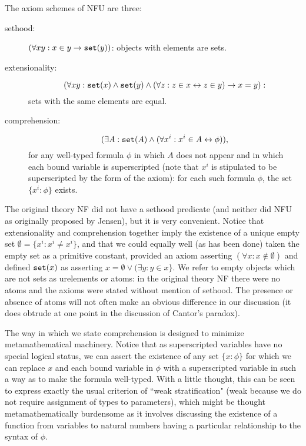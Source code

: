 \documentclass{slides}
\begin{document}
\begin{slide}

The axiom schemes of NFU are three:

\begin{description}

\item[sethood:]  $(\forall xy:  x \in y \rightarrow {\tt set}(y))$:  objects with elements are sets.

\item[extensionality:]  $$(\forall xy:  {\tt set}(x) \wedge {\tt set}(y) \wedge (\forall z:z \in x \leftrightarrow z \in y) \rightarrow x=y):$$  sets with the same elements are equal.

\item[comprehension:]  $$(\exists A:{\tt set}(A) \wedge (\forall x^i:x^i \in A \leftrightarrow \phi)),$$ for any well-typed formula $\phi$ in which $A$ does not appear and in which each bound variable is superscripted (note that $x^i$ is stipulated to be superscripted by the form of the axiom):  for each such formula $\phi$, the set $\{x^i:\phi\}$ exists.

\end{description}

\end{slide}

\begin{slide}

The original theory NF did not have a sethood predicate (and neither did NFU as originally proposed by Jensen), but it is very convenient.  Notice that extensionality and comprehension together imply the existence of a unique empty set $\emptyset = \{x^i:x^i \neq x^i\}$, and that we could equally well (as has been done) taken the empty set as a primitive constant,
provided an axiom asserting $(\forall x:x \not\in \emptyset)$
and defined ${\tt set}(x)$ as asserting $x = \emptyset \vee (\exists y:y \in x\}$.  We refer to empty objects which are not sets as urelements or atoms:  in the original theory NF there were no atoms and the axioms were stated without mention of sethood.  The presence or absence of atoms will not often make an obvious difference in our discussion (it does obtrude at one point in the discussion of Cantor's paradox).

\end{slide}

\begin{slide}

The way in which we state comprehension is designed to minimize metamathematical machinery.  Notice that as superscripted variables have no special logical status,
we can assert the existence of any set $\{x:\phi\}$ for which we can replace $x$ and each bound variable in $\phi$ with a superscripted variable in such a way as to make the
formula well-typed.  With a little thought, this can be seen to express exactly the usual criterion of ``weak stratification" (weak because we do not require assignment of types to parameters), which might be thought metamathematically burdensome as it involves discussing the existence of a function from variables to natural numbers having a particular relationship to the syntax of $\phi$.

\end{slide}
\end{document}
